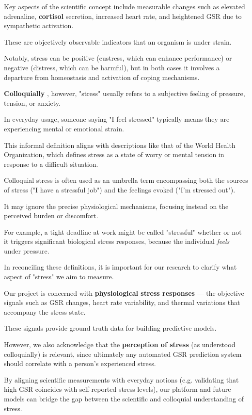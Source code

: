 Key aspects of the scientific concept include measurable changes such as elevated adrenaline, \textbf{cortisol}
 secretion, increased heart rate, and heightened GSR due to sympathetic activation.

These are objectively observable indicators that an organism is under strain.

Notably, stress can be positive (eustress, which can enhance performance) or negative (distress, which can be harmful), but in both cases it involves a departure from homeostasis and activation of coping mechanisms.

\textbf{Colloquially}
, however, "stress" usually refers to a subjective feeling of pressure, tension, or anxiety.

In everyday usage, someone saying "I feel stressed" typically means they are experiencing mental or emotional strain.

This informal definition aligns with descriptions like that of the World Health Organization, which defines stress as a state of worry or mental tension in response to a difficult situation.

Colloquial stress is often used as an umbrella term encompassing both the sources of stress ("I have a stressful job") and the feelings evoked ("I'm stressed out").

It may ignore the precise physiological mechanisms, focusing instead on the perceived burden or discomfort.

For example, a tight deadline at work might be called "stressful" whether or not it triggers significant biological stress responses, because the individual \textit{feels} under pressure.

In reconciling these definitions, it is important for our research to clarify what aspect of "stress" we aim to measure.

Our project is concerned with \textbf{physiological stress responses}
 --- the objective signals such as GSR changes, heart rate variability, and thermal variations that accompany the stress state.

These signals provide ground truth data for building predictive models.

However, we also acknowledge that the \textbf{perception of stress}
 (as understood colloquially) is relevant, since ultimately any automated GSR prediction system should correlate with a person's experienced stress.

By aligning scientific measurements with everyday notions (e.g. validating that high GSR coincides with self-reported stress levels), our platform and future models can bridge the gap between the scientific and colloquial understanding of stress.

